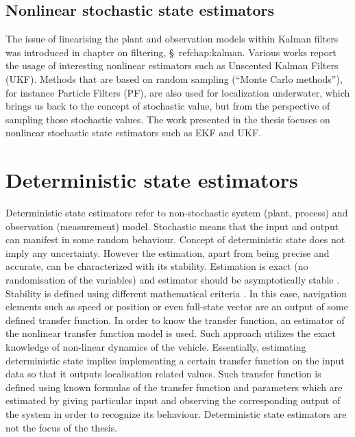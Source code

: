 \subsection{Nonlinear stochastic state estimators}
The issue of linearising the plant and observation models within Kalman filters was introduced in chapter on filtering, \S~ref{chap:kalman}. Various works report the usage of interesting nonlinear estimators such as Unscented Kalman Filters (UKF). Methods that are based on random sampling (``Monte Carlo methods''), for instance Particle Filters (PF), are also used for localization underwater, which brings us back to the concept of stochastic value, but from the perspective of sampling those stochastic values. The work presented in the thesis focuses on nonlinear stochastic state estimators such as EKF and UKF.
\section{Deterministic state estimators}
Deterministic state estimators refer to non-stochastic system (plant, process) and observation (measurement) model. Stochastic means that the input and output can manifest in some random behaviour. Concept of deterministic state does not imply any uncertainty. However the estimation, apart from being precise and accurate, can be characterized with its stability. Estimation is exact (no randomisation of the variables) and estimator should be asymptotically stable \cite{kinsey07}. Stability is defined using different mathematical criteria \cite{kinsey07}. In this case, navigation elements such as speed or position or even full-state vector are an output of some defined transfer function. In order to know the transfer function, an estimator of the nonlinear transfer function model is used. Such approach utilizes the exact knowledge of non-linear dynamics of the vehicle. Essentially, estimating deterministic state implies implementing a certain transfer function on the input data so that it outputs localisation related values. Such transfer function is defined using known formulas of the transfer function and parameters which are estimated by giving particular input and observing the corresponding output of the system in order to recognize its behaviour. Deterministic state estimators are not the focus of the thesis.
